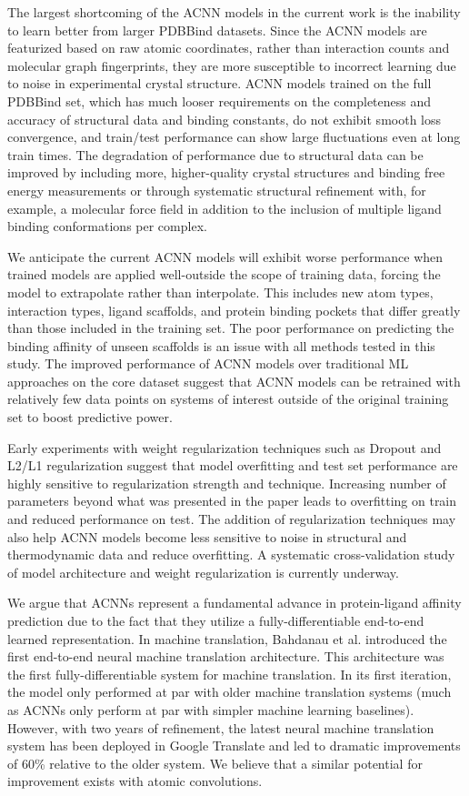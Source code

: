The largest shortcoming of the ACNN models in the current work is the inability to learn better from larger PDBBind datasets. Since the ACNN models are featurized based on raw atomic coordinates, rather than interaction counts and molecular graph fingerprints, they are more susceptible to incorrect learning due to noise in experimental crystal structure.  ACNN models trained on the full PDBBind set, which has much looser requirements on the completeness and accuracy of structural data and binding constants, do not exhibit smooth loss convergence, and train/test performance can show large fluctuations even at long train times.  The degradation of performance due to structural data can be improved by including more, higher-quality crystal structures and binding free energy measurements or through systematic structural refinement with, for example, a molecular force field in addition to the inclusion of multiple ligand binding conformations per complex.

We anticipate the current ACNN models will exhibit worse performance when trained models are applied well-outside the scope of training data, forcing the model to extrapolate rather than interpolate.  This includes new atom types, interaction types, ligand scaffolds, and protein binding pockets that differ greatly than those included in the training set.  The poor performance on predicting the binding affinity of unseen scaffolds is an issue with all methods tested in this study.  The improved performance of ACNN models over traditional ML approaches on the core dataset suggest that ACNN models can be retrained with relatively few data points on systems of interest outside of the original training set to boost predictive power. 

Early experiments with weight regularization techniques such as Dropout and L2/L1 regularization suggest that model overfitting and test set performance are highly sensitive to regularization strength and technique.  Increasing number of parameters beyond what was presented in the paper leads to overfitting on train and reduced performance on test.  The addition of regularization techniques may also help ACNN models become less sensitive to noise in structural and thermodynamic data and reduce overfitting.  A systematic cross-validation study of model architecture and weight regularization is currently underway.

We argue that ACNNs represent a fundamental advance in protein-ligand affinity prediction due to the fact that they utilize a fully-differentiable end-to-end learned representation. In machine translation, Bahdanau et al.\cite{bahdanau2014neural} introduced the first end-to-end neural machine translation architecture. This architecture was the first fully-differentiable system for machine translation. In its first iteration, the model only performed at par with older machine translation systems (much as ACNNs only perform at par with simpler machine learning baselines). However, with two years of refinement, the latest neural machine translation system has been deployed in Google Translate\cite{wu2016google} and led to dramatic improvements of 60\% relative to the older system. We believe that a similar potential for improvement exists with atomic convolutions.

